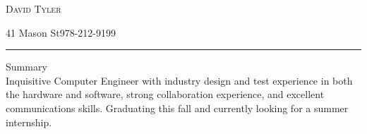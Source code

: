\documentclass[10pt,oneside]{article}
\makeatletter
\newcommand{\name}{David Tyler}
\newcommand{\addr}{41 Mason St}
\newcommand{\addrs}{Somerville, MA 02144}
\newcommand{\phone}{978-212-9199}
\newcommand{\email}{dtyler59@gmail.com}
\newcommand{\bigname}[1]{
	\begin{center}\fontfamily{phv}\selectfont\huge\scshape#1\end{center}
}
\newenvironment{ressectionplain}[1]{
	\vspace{4pt}
	{\fontfamily{phv}\selectfont\Large#1}\\
}
\makeatother
\begin{document}
 \selectfont

\bigname{\name}


\vspace{-1pt} {\small \addr \hfill \phone}\\
\vspace{-1pt}{\small \addrs \hfill \email}

\vspace{-8pt} \rule{\textwidth}{1pt}


\vspace{8 pt}




\begin{ressectionplain}{Summary}

Inquisitive Computer Engineer with industry design and test experience in both the hardware and software, strong collaboration experience, and excellent communications skills. Graduating this fall and currently looking for a summer internship.\newline





\end{ressectionplain}
\end{document}
